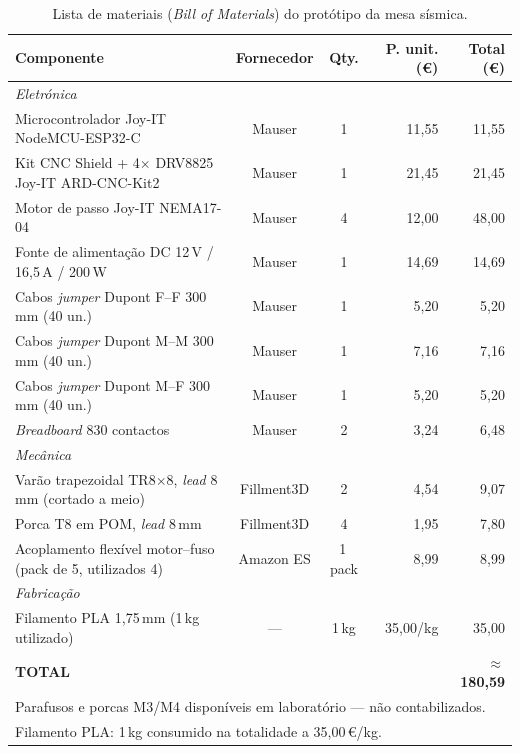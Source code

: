 \begin{table}[h]
\centering
\caption{Lista de materiais (\textit{Bill of Materials}) do protótipo da mesa sísmica.}
\label{tab:bom}
\begin{tabular}{p{6.2cm}ccrr}
\hline
\textbf{Componente} & \textbf{Fornecedor} & \textbf{Qty.} & \textbf{P. unit. (\euro{})} & \textbf{Total (\euro{})} \\
\hline
\multicolumn{5}{l}{\textit{Eletrónica}} \\
\hline
Microcontrolador Joy-IT NodeMCU-ESP32-C~\cite{JoyITESP32}
  & Mauser & 1 & 11,55 & 11,55 \\
Kit CNC Shield + 4$\times$ DRV8825 Joy-IT ARD-CNC-Kit2~\cite{JoyITCNCKit2}
  & Mauser & 1 & 21,45 & 21,45 \\
Motor de passo Joy-IT NEMA17-04~\cite{JoyITNEMA17}
  & Mauser & 4 & 12,00 & 48,00 \\
Fonte de alimentação DC 12\,V / 16,5\,A / 200\,W~\cite{FonteMauser}
  & Mauser & 1 & 14,69 & 14,69 \\
Cabos \textit{jumper} Dupont F--F 300\,mm (40 un.)~\cite{JumperFF}
  & Mauser & 1 & 5,20 & 5,20 \\
Cabos \textit{jumper} Dupont M--M 300\,mm (40 un.)~\cite{JumperMM}
  & Mauser & 1 & 7,16 & 7,16 \\
Cabos \textit{jumper} Dupont M--F 300\,mm (40 un.)~\cite{JumperMF}
  & Mauser & 1 & 5,20 & 5,20 \\
\textit{Breadboard} 830 contactos~\cite{BreadboardMauser}
  & Mauser & 2 & 3,24 & 6,48 \\
\hline
\multicolumn{5}{l}{\textit{Mecânica}} \\
\hline
Varão trapezoidal TR8$\times$8, \textit{lead} 8\,mm (cortado a meio)~\cite{Fillment3DVarao}
  & Fillment3D & 2 & 4,54 & 9,07 \\
Porca T8 em POM, \textit{lead} 8\,mm~\cite{Fillment3DPorca}
  & Fillment3D & 4 & 1,95 & 7,80 \\
Acoplamento flexível motor--fuso (pack de 5, utilizados 4)~\cite{AcopladorAmazon}
  & Amazon ES & 1\,pack & 8,99 & 8,99 \\
\hline
\multicolumn{5}{l}{\textit{Fabricação}} \\
\hline
Filamento PLA 1,75\,mm (1\,kg utilizado)
  & --- & 1\,kg & 35,00/kg & 35,00 \\
\hline
\textbf{TOTAL} & & & & \textbf{$\approx$180,59} \\
\hline
\multicolumn{5}{l}{\footnotesize Parafusos e porcas M3/M4 disponíveis em laboratório --- não contabilizados.} \\
\multicolumn{5}{l}{\footnotesize Filamento PLA: 1\,kg consumido na totalidade a 35,00\,€/kg.} \\
\end{tabular}
\end{table}

